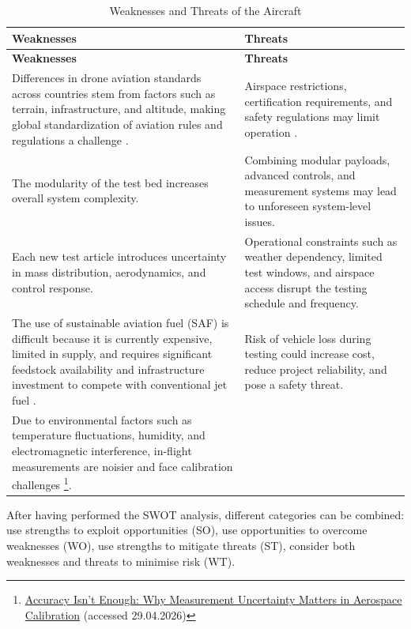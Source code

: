 \begin{longtable}{|p{}|p{}|}
\caption{Weaknesses and Threats of the Aircraft}
\label{tab:WT} \\

\hline
\rowcolor[HTML]{ABE7F3}
\textbf{Weaknesses} & \textbf{Threats} \\ \hline
\endfirsthead

\hline
\rowcolor[HTML]{ABE7F3}
\textbf{Weaknesses} & \textbf{Threats} \\ \hline
\endhead

Differences in drone aviation standards across countries stem from factors such as terrain, infrastructure, and altitude, making global standardization of aviation rules and regulations a challenge \cite{Bhat2024}.
&
Airspace restrictions, certification requirements, and safety regulations may limit operation \cite{Bhat2024}.
\\ \hline

\rowcolor[HTML]{ECF4FF}
The modularity of the test bed increases overall system complexity.
&
Combining modular payloads, advanced controls, and measurement systems may lead to unforeseen system-level issues.
\\ \hline

Each new test article introduces uncertainty in mass distribution, aerodynamics, and control response.
&
Operational constraints such as weather dependency, limited test windows, and airspace access disrupt the testing schedule and frequency.
\\ \hline

\rowcolor[HTML]{ECF4FF}
The use of sustainable aviation fuel (SAF) is difficult because it is currently expensive, limited in supply, and requires significant feedstock availability and infrastructure investment to compete with conventional jet fuel \cite{Kumar2025}.
&
Risk of vehicle loss during testing could increase cost, reduce project reliability, and pose a safety threat.
\\ \hline

Due to environmental factors such as temperature fluctuations, humidity, and electromagnetic interference, in-flight measurements are noisier and face calibration challenges \footnote{\href{https://www.simco.com/blog/why-measurement-uncertainty-matters-in-aerospace-calibration/}{Accuracy Isn’t Enough: Why Measurement Uncertainty Matters in Aerospace Calibration} (accessed 29.04.2026)}.
&

\\ \hline

\end{longtable}

After having performed the SWOT analysis, different categories can be combined: use strengths to exploit opportunities (SO), use opportunities to overcome weaknesses (WO), use strengths to mitigate threats (ST), consider both weaknesses and threats to minimise risk (WT).


